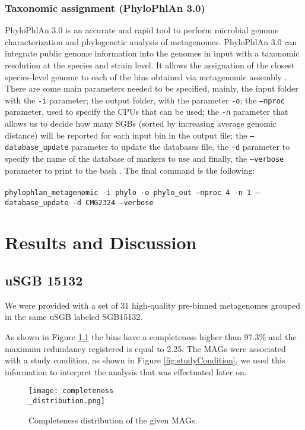 \documentclass[a4paper,titlepage, oneside]{book}
\newcommand{\code}[1]{\colorbox{light-gray}{\texttt{#1}}}
\begin{document}
\subsection{Taxonomic assignment (PhyloPhlAn 3.0)}

PhyloPhlAn 3.0 is an accurate and rapid tool to perform microbial genome characterization and phylogenetic analysis of metagenomes. PhyloPhlAn 3.0 can integrate public genome information into the genomes in input with a taxonomic resolution at the species and strain level. It allows the assignation of the closest species-level genome to each of the bins obtained via metagenomic assembly \cite{Phylo}.
There are some main parameters needed to be specified, mainly, the input folder with the \code{-i} parameter; the output folder, with the parameter \code{-o}; the \code{--nproc} parameter, used to specify the CPUs that can be used; the \code{-n} parameter that allows us to decide  how many SGBs (sorted by increasing average genomic distance) will be reported for each input bin in the output file; the \code{--database\_update} parameter to update the databases file, the \code{-d} parameter to specify the name of the database of markers to use and finally, the \code{--verbose} parameter to print to the bash \cite{PhyloGuide}.
The final command is the following:\\ \newline \\ \code{phylophlan\_metagenomic -i phylo -o phylo\_out --nproc 4 -n 1 --database\_update -d CMG2324 --verbose}

\chapter{Results and Discussion}

\section{uSGB 15132}

We were provided with a set of 31 high-quality pre-binned metagenomes grouped in the same uSGB labeled SGB15132.

As shown in Figure \ref{fig:compl} the bins have a completeness higher than 97.3\% and the maximum redundancy registered is equal to 2.25.
The MAGs were associated with a study condition, as shown in Figure \ref{fig:studyCondition}, we used this information to interpret the analysis that was effectuated later on.

\begin{figure}[ht]
\centering
\texttt{[image: completeness\\\_distribution.png]}
\caption{Completeness distribution of the given MAGs.}
\label{fig:compl}
\end{figure}
\end{document}
